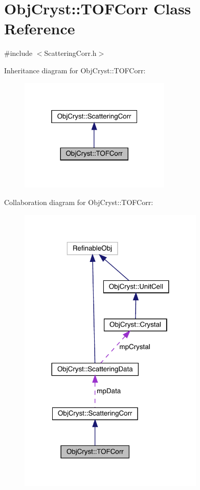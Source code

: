 \hypertarget{class_obj_cryst_1_1_t_o_f_corr}{}\section{Obj\+Cryst\+::T\+O\+F\+Corr Class Reference}
\label{class_obj_cryst_1_1_t_o_f_corr}


{\ttfamily \#include $<$Scattering\+Corr.\+h$>$}



Inheritance diagram for Obj\+Cryst\+::T\+O\+F\+Corr\+:
\nopagebreak
\begin{figure}[H]
\begin{center}
\leavevmode
\includegraphics[width=205pt]{class_obj_cryst_1_1_t_o_f_corr__inherit__graph}
\end{center}
\end{figure}


Collaboration diagram for Obj\+Cryst\+::T\+O\+F\+Corr\+:
\nopagebreak
\begin{figure}[H]
\begin{center}
\leavevmode
\includegraphics[width=251pt]{class_obj_cryst_1_1_t_o_f_corr__coll__graph}
\end{center}
\end{figure}

